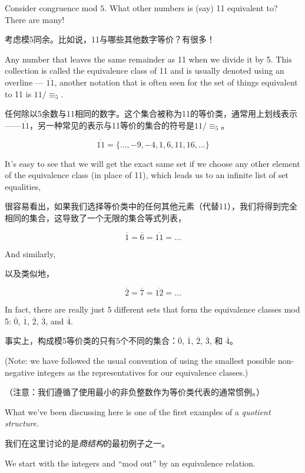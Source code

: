 Consider congruence
mod $5$.  What other numbers is (say) 11 equivalent to?  There are many!

考虑模5同余。比如说，11与哪些其他数字等价？有很多！

Any 
number that leaves the same remainder as 11 when we divide it by 5.  This collection
is called the equivalence class of 11 and is usually denoted using an overline --- 
$\overline{11}$, another notation that is often seen for the set of things equivalent 
to 11 is $11/\equiv_5$.

任何除以5余数与11相同的数字。这个集合被称为11的等价类，通常用上划线表示——$\overline{11}$，另一种常见的表示与11等价的集合的符号是$11/\equiv_5$。

\[ \overline{11} = \{ \ldots, -9, -4, 1, 6, 11, 16, \ldots \} \]

It's easy to see that we will get the exact same set if we choose any other element
of the equivalence class (in place of 11), which leads us to an infinite list of set
equalities,

很容易看出，如果我们选择等价类中的任何其他元素（代替11），我们将得到完全相同的集合，这导致了一个无限的集合等式列表，

\[   \overline{1} = \overline{6} = \overline{11} = \ldots \]

\noindent And similarly, 

\noindent 以及类似地，

\[   \overline{2} = \overline{7} = \overline{12} = \ldots \]

\noindent In fact, there are really just 5 different sets that form the
equivalence classes mod 5:  $\overline{0}$, $\overline{1}$, $\overline{2}$, $\overline{3}$, 
and $\overline{4}$.

\noindent 事实上，构成模5等价类的只有5个不同的集合：$\overline{0}$, $\overline{1}$, $\overline{2}$, $\overline{3}$, 和 $\overline{4}$。

(Note: we have followed the usual convention of using the smallest
 possible non-negative integers as the representatives for our equivalence classes.)

（注意：我们遵循了使用最小的非负整数作为等价类代表的通常惯例。）

What we've been discussing here is one of the first examples of a 
\emph{quotient structure}.

我们在这里讨论的是\emph{商结构}的最初例子之一。

We start with the integers and ``mod out'' by an equivalence relation.

